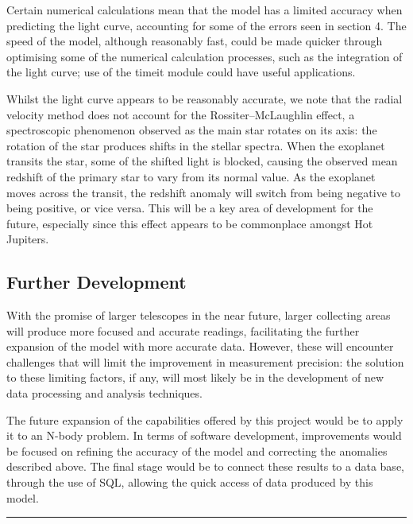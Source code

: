 \documentclass[11pt]{article}
\begin{document}
Certain numerical calculations mean that the model has a limited
accuracy when predicting the light curve, accounting for some of the
errors seen in section 4. The speed of the model, although reasonably
fast, could be made quicker through optimising some of the numerical
calculation processes, such as the integration of the light curve; use
of the timeit module could have useful applications.

Whilst the light curve appears to be reasonably accurate, we note that
the radial velocity method does not account for the Rossiter--McLaughlin
effect, a spectroscopic phenomenon observed as the main star rotates on
its axis: the rotation of the star produces shifts in the stellar
spectra. When the exoplanet transits the star, some of the shifted light
is blocked, causing the observed mean redshift of the primary star to
vary from its normal value. As the exoplanet moves across the transit,
the redshift anomaly will switch from being negative to being positive,
or vice versa. This will be a key area of development for the future,
especially since this effect appears to be commonplace amongst Hot
Jupiters.

\hypertarget{further-development}{%
\subsection{Further Development}\label{further-development}}

With the promise of larger telescopes in the near future, larger
collecting areas will produce more focused and accurate readings,
facilitating the further expansion of the model with more accurate data.
However, these will encounter challenges that will limit the improvement
in measurement precision: the solution to these limiting factors, if
any, will most likely be in the development of new data processing and
analysis techniques.

The future expansion of the capabilities offered by this project would
be to apply it to an N-body problem. In terms of software development,
improvements would be focused on refining the accuracy of the model and
correcting the anomalies described above. The final stage would be to
connect these results to a data base, through the use of SQL, allowing
the quick access of data produced by this model.

\pagebreak
\begin{center}\rule{0.5\linewidth}{0.5pt}\end{center}
\end{document}
